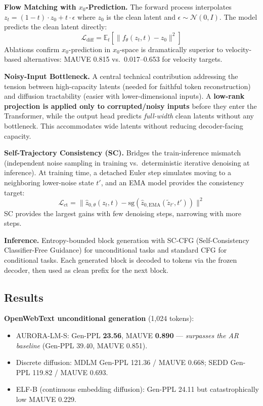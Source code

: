\documentclass[11pt,a4paper]{article}
\begin{document}
\textbf{Flow Matching with $x_0$-Prediction.} The forward process interpolates $z_t = (1-t) \cdot z_0 + t \cdot \epsilon$ where $z_0$ is the clean latent and $\epsilon \sim \mathcal{N}(0, I)$. The model predicts the clean latent directly:
\begin{equation}
    \mathcal{L}_{\text{diff}} = \mathbb{E}_t\!\left[\| f_\theta(z_t, t) - z_0 \|^2\right]
\end{equation}
Ablations confirm $x_0$-prediction in $x_0$-space is dramatically superior to velocity-based alternatives: MAUVE 0.815 vs.\ 0.017--0.653 for velocity targets.

\textbf{Noisy-Input Bottleneck.} A central technical contribution addressing the tension between high-capacity latents (needed for faithful token reconstruction) and diffusion tractability (easier with lower-dimensional inputs). A \textbf{low-rank projection is applied only to corrupted/noisy inputs} before they enter the Transformer, while the output head predicts \emph{full-width} clean latents without any bottleneck. This accommodates wide latents without reducing decoder-facing capacity.

\textbf{Self-Trajectory Consistency (SC).} Bridges the train-inference mismatch (independent noise sampling in training vs.\ deterministic iterative denoising at inference). At training time, a detached Euler step simulates moving to a neighboring lower-noise state $t'$, and an EMA model provides the consistency target:
\begin{equation}
    \mathcal{L}_{\text{ct}} = \| \hat{z}_{0,\theta}(z_t, t) - \text{sg}(\hat{z}_{0,\text{EMA}}(\tilde{z}_{t'}, t')) \|^2
\end{equation}
SC provides the largest gains with few denoising steps, narrowing with more steps.

\textbf{Inference.} Entropy-bounded block generation with SC-CFG (Self-Consistency Classifier-Free Guidance) for unconditional tasks and standard CFG for conditional tasks. Each generated block is decoded to tokens via the frozen decoder, then used as clean prefix for the next block.

\subsection{Results}
\textbf{OpenWebText unconditional generation} (1,024 tokens):
\begin{itemize}
    \item AURORA-LM-S: Gen-PPL \textbf{23.56}, MAUVE \textbf{0.890} --- \emph{surpasses the AR baseline} (Gen-PPL 39.40, MAUVE 0.851).
    \item Discrete diffusion: MDLM Gen-PPL 121.36 / MAUVE 0.668; SEDD Gen-PPL 119.82 / MAUVE 0.693.
    \item ELF-B (continuous embedding diffusion): Gen-PPL 24.11 but catastrophically low MAUVE 0.229.
\end{itemize}
\end{document}
